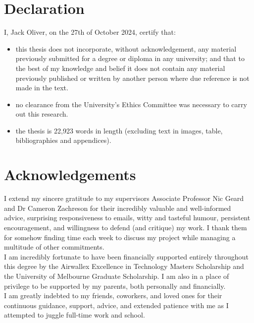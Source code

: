 \clearpage

\section*{Declaration}

I, Jack Oliver, on the 27th of October 2024, certify that:
\begin{itemize}
    \item this thesis does not incorporate, without acknowledgement, any material previously submitted for a degree or diploma in any university; and that to the best of my knowledge and belief it does not contain any material previously published or written by another person where due reference is not made in the text.
    \item no clearance from the University's Ethics Committee was necessary to carry out this research.
    \item the thesis is 22,923 words in length (excluding text in images, table, bibliographies and appendices).
\end{itemize}

\clearpage

\section*{Acknowledgements}

I extend my sincere gratitude to my supervisors Associate Professor Nic Geard and Dr Cameron Zachreson for their incredibly valuable and well-informed advice, surprising responsiveness to emails, witty and tasteful humour, persistent encouragement, and willingness to defend (and critique) my work. I thank them for somehow finding time each week to discuss my project while managing a multitude of other commitments. \\

\noindent I am incredibly fortunate to have been financially supported entirely throughout this degree by the Airwallex Excellence in Technology Masters Scholarship and the University of Melbourne Graduate Scholarship. I am also in a place of privilege to be supported by my parents, both personally and financially. \\

\noindent I am greatly indebted to my friends, coworkers, and loved ones for their continuous guidance, support, advice, and extended patience with me as I attempted to juggle full-time work and school.
